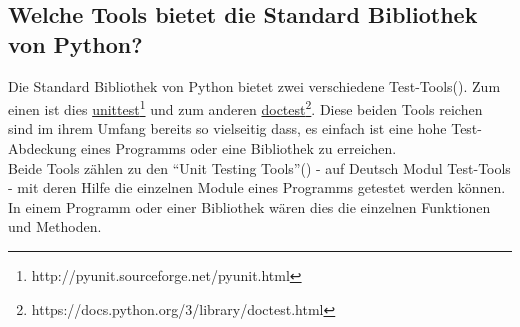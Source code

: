 \subsection{Welche Tools bietet die Standard Bibliothek von Python?}\label{python-tools:stdlib}

Die Standard Bibliothek von Python bietet zwei verschiedene Test-Tools(\cite{wiki.python:PythonTestingToolsTaxonomy}).
Zum einen ist dies
\href{http://pyunit.sourceforge.net/pyunit.html}{unittest}\footnote{http://pyunit.sourceforge.net/pyunit.html}
und zum anderen
\href{https://docs.python.org/3/library/doctest.html}{doctest}\footnote{https://docs.python.org/3/library/doctest.html}.
Diese beiden Tools reichen sind im ihrem Umfang bereits so vielseitig dass, es einfach ist eine hohe Test-Abdeckung eines Programms oder eine Bibliothek zu erreichen.
\newline
\\
Beide Tools zählen zu den "`Unit Testing Tools"'(\cite{wiki.python:PythonTestingToolsTaxonomy}) -
auf Deutsch Modul Test-Tools - mit deren Hilfe die einzelnen Module eines Programms
getestet werden können. In einem Programm oder einer Bibliothek wären dies die einzelnen
Funktionen und Methoden.